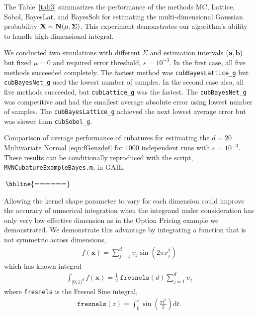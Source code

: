 \documentclass{iitthesis}          %
\newcommand{\bm}[1]{\boldsymbol{#1}}
\newcommand{\dif}[1]{\text{d}{#1}}
\newcommand{\vx}{\bm{x}}
\newcommand{\dt}{\dif{{t}}}
\newcommand{\code}[1]{\texttt{#1}}
\newcommand{\JRNote}[1]{}
\begin{document}
{{{{{{
The Table~\ref{tab3} summarizes the performance of the methods MC, Lattice, Sobol,
BayesLat, and BayesSob for estimating the multi-dimensional Gaussian probability $\bf{X}\sim N(\bf{\mu},\Sigma)$. This experiment demonstrates our algorithm's ability to handle  high-dimensional integral.

We conducted two simulations with different $\Sigma$ and estimation intervals $(\bf{a}, \bf{b})$ but fixed $\mu=0$ and required error threshold, $\varepsilon=10^{-3}$. In the first case, all five methods succeeded completely. 
The fastest method was \code{cubBayesLattice\_g} but \code{cubBayesNet\_g} used the lowest number of samples.
In the second case also, all five methods succeeded,  but \code{cubLattice\_g} was the fastest. 
The \code{cubBayesNet\_g}  was competitive and had the smallest average absolute error using lowest number of samples. The \code{cubBayesLattice\_g} achieved the next lowest average error but was slower than \code{cubSobol\_g}.

\begin{table}[ht] %
\centering
\caption{Comparison of average performance of cubatures for estimating the $d=20$ Multivariate Normal \eqref{eqn:fGenzdef} for $1000$ independent runs with $\varepsilon=10^{-3}$. These results can be conditionally reproduced with the script, \code{MVNCubatureExampleBayes.m}, in GAIL. 
\label{tab3}}	   
$
\arraycolsep=1.4pt\def\arraystretch{0.9}
\begin{array}{l@{\quad}r@{\quad}r@{\quad}r@{\quad}r@{\quad}r@{\quad}r}
\hhline{======}
 
\end{array}
$
\end{table}


\clearpage










\JRNote{ Numerical examples for the case of shape parameter per dimension }

Allowing the kernel shape parameter to vary for each dimension could improve the accuracy of numerical integration when the integrand under consideration has only very low effective dimension  as in the Option Pricing example we demonstrated. We demonstrate this advantage by integrating a function that is not symmetric across dimensions,
\begin{align}
\label{eqn:fresnels}
f(\vx) = \sum_{j=1}^d \upsilon_j \sin(2 \pi x_j^2)
\end{align} 
which has known integral
\begin{align*}
\int_{[0,1)^d} f(\vx)  = \frac{1}{2} \; \code{fresnels}(d) \sum_{j=1}^{d} \upsilon_j
\end{align*}
where \code{fresnels} is the Fresnel Sine integral,
\begin{align*}
\code{fresnels}(z) = \int_{0}^{z} \sin \left( \frac{\pi t^2}{2} \right) \dt.
\end{align*}


}}}}}}
\end{document}
